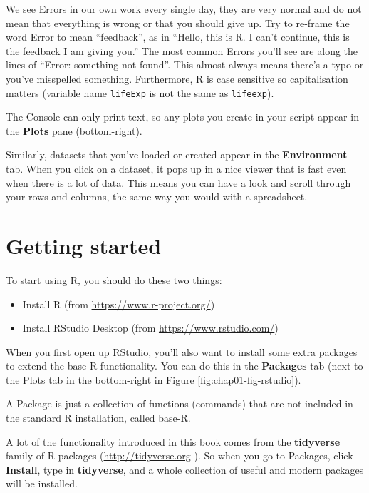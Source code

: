 \documentclass[
  12pt,
  krantz2]{krantz}
\providecommand{\tightlist}{%
  \setlength{\itemsep}{0pt}\setlength{\parskip}{0pt}}
\begin{document}
We see Errors in our own work every single day, they are very normal and do not mean that everything is wrong or that you should give up.
Try to re-frame the word Error to mean ``feedback'', as in ``Hello, this is R. I can't continue, this is the feedback I am giving you.''
The most common Errors you'll see are along the lines of ``Error: something not found''.
This almost always means there's a typo or you've misspelled something.
Furthermore, R is case sensitive so capitalisation matters (variable name \texttt{lifeExp} is not the same as \texttt{lifeexp}).

The Console can only print text, so any plots you create in your script appear in the \textbf{Plots} pane (bottom-right).

Similarly, datasets that you've loaded or created appear in the \textbf{Environment} tab.
When you click on a dataset, it pops up in a nice viewer that is fast even when there is a lot of data.
This means you can have a look and scroll through your rows and columns, the same way you would with a spreadsheet.

\hypertarget{getting-started}{%
\section{Getting started}\label{getting-started}}


To start using R, you should do these two things:

\begin{itemize}
\tightlist
\item
  Install R (from \url{https://www.r-project.org/})
\item
  Install RStudio Desktop (from \url{https://www.rstudio.com/})
\end{itemize}

When you first open up RStudio, you'll also want to install some extra packages to extend the base R functionality.
You can do this in the \textbf{Packages} tab (next to the Plots tab in the bottom-right in Figure \ref{fig:chap01-fig-rstudio}).

A Package is just a collection of functions (commands) that are not included in the standard R installation, called base-R.

A lot of the functionality introduced in this book comes from the \textbf{tidyverse} family of R packages (\url{http://tidyverse.org} \citet{tidyverse2019}).
So when you go to Packages, click \textbf{Install}, type in \textbf{tidyverse}, and a whole collection of useful and modern packages will be installed.
\end{document}
